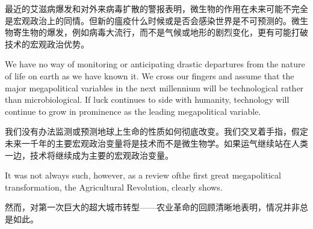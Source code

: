 \begin{Parallel}{97mm}{72mm}
  \ParallelRText
  {最近的艾滋病爆发和对外来病毒扩散的警报表明，微生物的作用在未来可能不完全是宏观政治上的同情。但新的瘟疫什么时候或是否会感染世界是不可预测的。微生物寄生物的爆发，例如病毒大流行，而不是气候或地形的剧烈变化，更有可能打破技术的宏观政治优势。}
  \ParallelPar



  \ParallelLText
  {We have no way of monitoring or anticipating drastic departures from the nature of life on earth as we have known it. We cross our fingers and assume that the major megapolitical variables in the next millennium will be technological rather than microbiological. If luck continues to side with humanity, technology will continue to grow in prominence as the leading megapolitical variable.}
  
  \ParallelRText
  {我们没有办法监测或预测地球上生命的性质如何彻底改变。我们交叉着手指，假定未来一千年的主要宏观政治变量将是技术而不是微生物学。如果运气继续站在人类一边，技术将继续成为主要的宏观政治变量。}
  \ParallelPar



  \ParallelLText
  {It was not always such, however, as a review ofthe first great megapolitical transformation, the Agricultural Revolution, clearly shows.}
  
  \ParallelRText
  {然而，对第一次巨大的超大城市转型——农业革命的回顾清晰地表明，情况并非总是如此。}
  \ParallelPar

\end{Parallel}
